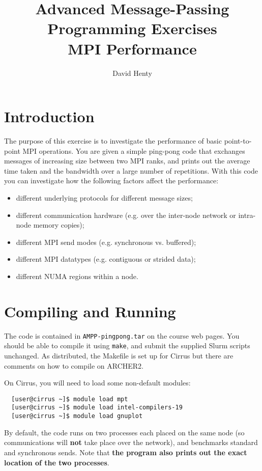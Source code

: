 \documentclass{article}
\begin{document}
\title{Advanced Message-Passing Programming Exercises \\
	MPI Performance}

\author{David Henty}
\date{}
\makeEPCCtitle

\section{Introduction}

The purpose of this exercise is to investigate the performance of
basic point-to-point MPI operations. You are given a simple ping-pong
code that exchanges messages of increasing size between two MPI ranks,
and prints out the average time taken and the bandwidth over a large
number of repetitions. With this code you can investigate how the
following factors affect the performance:

\begin{itemize}

\item different underlying protocols for different message sizes;
\item different communication hardware (e.g. over the inter-node network or
  intra-node memory copies);
\item different MPI send modes (e.g. synchronous vs. buffered);
\item different MPI datatypes (e.g. contiguous or strided data);
\item different NUMA regions within a node.

\end{itemize}

\section{Compiling and Running}

The code is contained in \verb+AMPP-pingpong.tar+ on the course web
pages. You should be able to compile it using \verb+make+, and submit
the supplied Slurm scripts unchanged. As distributed, the Makefile is
set up for Cirrus but there are comments on how to compile on ARCHER2.

On Cirrus, you will need to load some non-default modules:
\begin{verbatim}
  [user@cirrus ~]$ module load mpt
  [user@cirrus ~]$ module load intel-compilers-19
  [user@cirrus ~]$ module load gnuplot
\end{verbatim}

By default, the code runs on two processes each placed on the same
node (so communications will {\bf not} take place over the
network), and benchmarks standard and synchronous sends. Note that
{\bf the program also prints out the exact location of the two
  processes}.
\end{document}
